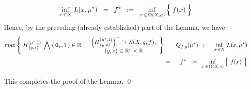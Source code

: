 \begin{enumerate}
	\begin{equation*}
		\underset{x\,\in X}{\inf}\;L(x,\mu^{*})
	\;\; = \;\;
		f^{*}
	\;\; := \;\;
		\underset{x\,\in\,\Omega(X,g)}{\inf}\left\{\;
			\overset{{\color{white}.}}{f(x)}
			\;\right\}
	\end{equation*}
	Hence, by the preceding (already established) part of the Lemma, we have
	\begin{eqnarray*}
	\max\left\{\;
		H^{(\mu^{*},1)}_{\,(y,z)} \;\bigwedge\; (\,\mathbf{0}_{r},1\,) \in \Re
		\;\,\left\vert\,
		\begin{array}{c}
			\left(H^{(\mu^{*},1)}_{\,(y,z)}\right)^{+} \supset\, S(X,g,f)\,,
			\\
			(y,z) \in \Re^{r} \times \Re
			\end{array}
		\!\right.\right\}
	& = &
		Q_{f,g}(\mu^{*})
	\;\; := \;\;
		\underset{x\,\in X}{\inf}\;L(x,\mu^{*})
	\\
	& = &
		f^{*}
	\;\; := \;\,
		\underset{x\,\in\,\Omega(X,g)}{\inf}\left\{\;
			\overset{{\color{white}.}}{f(x)}
			\;\right\}
	\end{eqnarray*}
\end{enumerate}
This completes the proof of the Lemma.
\qed


